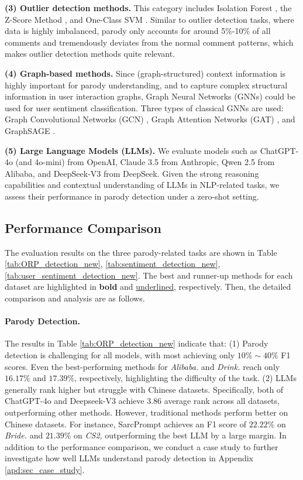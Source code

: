\textbf{(3) Outlier detection methods.} This category includes Isolation Forest \citep{IsolationForest}, the Z-Score Method \citep{Z-Score}, and One-Class SVM \citep{OneclassSVM}. Similar to outlier detection tasks, where data is highly imbalanced, parody only accounts for around 5\%-10\% of all comments and tremendously deviates from the normal comment patterns, which makes outlier detection methods quite relevant.

\textbf{(4) Graph-based methods.} Since (graph-structured) context information is highly important for parody understanding, and to capture complex structural information in user interaction graphs, Graph Neural Networks (GNNs) could be used for user sentiment classification. Three types of classical GNNs are used: Graph Convolutional Networks (GCN) \citep{GCN}, Graph Attention Networks (GAT) \citep{GAT}, and GraphSAGE \citep{GraphSAGE}.

\textbf{(5) Large Language Models (LLMs).} We evaluate models such as ChatGPT-4o (and 4o-mini) \citep{GPT4} from OpenAI, Claude 3.5 \citep{Claude} from Anthropic, Qwen 2.5 \citep{Qwen2.5} from Alibaba, and DeepSeek-V3 \citep{DeepSeek} from DeepSeek. Given the strong reasoning capabilities and contextual understanding of LLMs in NLP-related tasks, we assess their performance in parody detection under a zero-shot setting.


\subsection{Performance Comparison}\label{sec:exp_performance}
The evaluation results on the three parody-related tasks are shown in Table \ref{tab:ORP_detection_new}, \ref{tab:sentiment_detection_new},  \ref{tab:user_sentiment_detection_new}. The best and runner-up methods for each dataset are highlighted in \textbf{bold} and \underline{underlined}, respectively. Then, the detailed comparison and analysis are as follows.


\paragraph{Parody Detection.} The results in Table \ref{tab:ORP_detection_new} indicate that: (1) Parody detection is challenging for all models, with most achieving only $10\%\sim40\%$ F1 scores. Even the best-performing methods for \textit{Alibaba.} and \textit{Drink.} reach only $16.17\%$ and $17.39\%$, respectively, highlighting the difficulty of the task. (2) LLMs generally rank higher but struggle with Chinese datasets. Specifically, both of ChatGPT-4o and Deepseek-V3 achieve $3.86$ average rank across all datasets, outperforming other methods. However, traditional methods perform better on Chinese datasets. For instance, SarcPrompt achieves an F1 score of $22.22\%$ on \textit{Bride.} and $21.39\%$ on \textit{CS2}, outperforming the best LLM by a large margin. In addition to the performance comparison, we conduct a case study to further investigate how well LLMs understand parody detection in Appendix \ref{apd:sec_case_study}.

